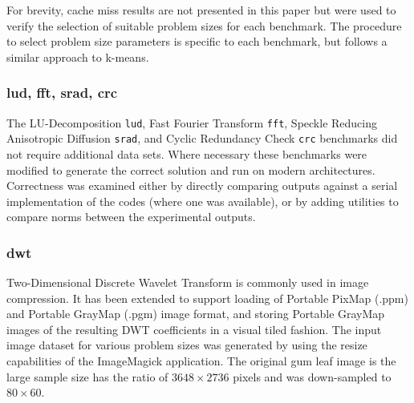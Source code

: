 \documentclass[../document.tex]{subfiles}
\begin{document}
For brevity, cache miss results are not presented in this paper but were used to verify the selection of suitable problem sizes for each benchmark.
The procedure to select problem size parameters is specific to each benchmark, but follows a similar approach to k-means.

\subsubsection{lud, fft, srad, crc}
The LU-Decomposition {\tt lud}, Fast Fourier Transform {\tt fft}, Speckle Reducing Anisotropic Diffusion {\tt srad}, and Cyclic Redundancy Check {\tt crc} benchmarks did not require additional data sets.
Where necessary these benchmarks were modified to generate the correct solution and run on modern architectures.
Correctness was examined either by directly comparing outputs against a serial implementation of the codes (where one was available), or by adding utilities to compare norms between the experimental outputs.


\subsubsection{dwt}
Two-Dimensional Discrete Wavelet Transform is commonly used in image compression.
It has been extended to support loading of Portable PixMap (.ppm) and Portable GrayMap (.pgm) image format, and storing Portable GrayMap images of the resulting DWT coefficients in a visual tiled fashion.
The input image dataset for various problem sizes was generated by using the resize capabilities of the ImageMagick application.
The original gum leaf image is the large sample size has the ratio of $3648 \times 2736$ pixels and was down-sampled to  $80 \times 60$.
\end{document}
